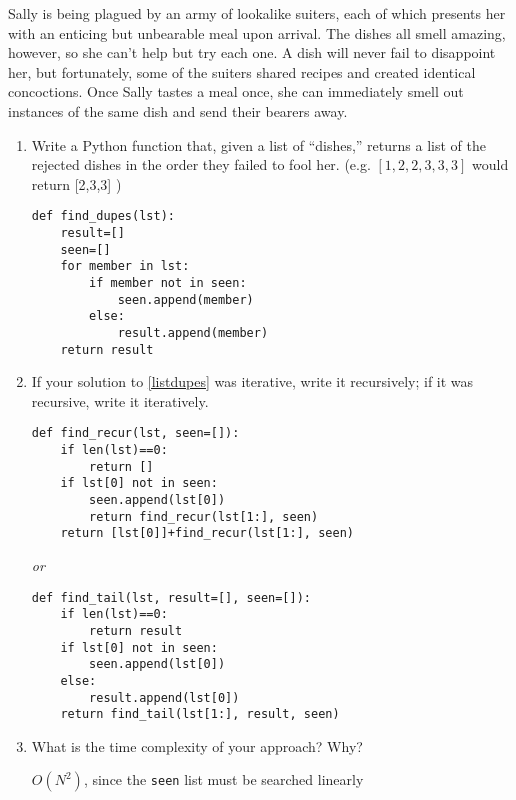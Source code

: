 %
%


Sally is being plagued by an army of lookalike suiters, each of which presents her with an enticing but unbearable meal upon arrival.
The dishes all smell amazing, however, so she can't help but try each one.
A dish will never fail to disappoint her, but fortunately, some of the suiters shared recipes and created identical concoctions.
Once Sally tastes a meal once, she can immediately smell out instances of the same dish and send their bearers away.
\begin{enumerate}
\item
\label{listdupes}
Write a Python function that, given a list of ``dishes,'' returns a list of the rejected dishes in the order they failed to fool her. (e.g. $[1, 2, 2, 3, 3, 3]$ would return [2,3,3] )
\begin{answer}
\begin{lstlisting}
def find_dupes(lst):
	result=[]
	seen=[]
	for member in lst:
		if member not in seen:
			seen.append(member)
		else:
			result.append(member)
	return result
\end{lstlisting}
\end{answer}

\item
If your solution to \ref{listdupes} was iterative, write it recursively; if it was recursive, write it iteratively.
\begin{answer}
\begin{lstlisting}
def find_recur(lst, seen=[]):
	if len(lst)==0:
		return []
	if lst[0] not in seen:
		seen.append(lst[0])
		return find_recur(lst[1:], seen)
	return [lst[0]]+find_recur(lst[1:], seen)
\end{lstlisting}
\textit{or}
\begin{lstlisting}
def find_tail(lst, result=[], seen=[]):
	if len(lst)==0:
		return result
	if lst[0] not in seen:
		seen.append(lst[0])
	else:
		result.append(lst[0])
	return find_tail(lst[1:], result, seen)
\end{lstlisting}
\end{answer}

\item
What is the time complexity of your approach?
Why? \\

\begin{answer}
$O(N^2)$, since the \texttt{seen} list must be searched linearly
\end{answer}
\end{enumerate}